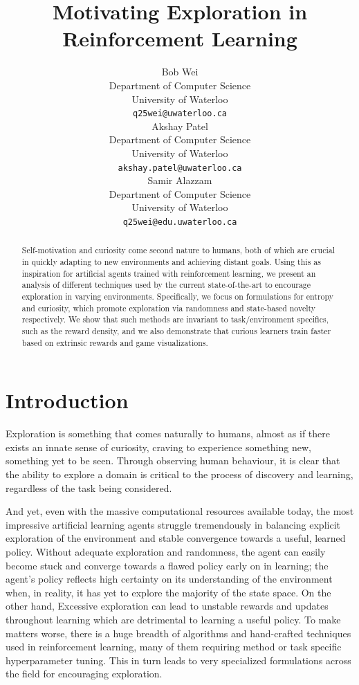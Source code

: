 \documentclass{article}
\title{Motivating Exploration in Reinforcement Learning}
\author{
  Bob Wei\\
  Department of Computer Science\\
  University of Waterloo\\
  \texttt{q25wei@uwaterloo.ca} \\
  \And
  Akshay Patel \\
  Department of Computer Science\\
  University of Waterloo\\
  \texttt{akshay.patel@uwaterloo.ca} \\
  \AND
  Samir Alazzam \\
  Department of Computer Science\\
  University of Waterloo\\
  \texttt{q25wei@edu.uwaterloo.ca} \\
}
\begin{document}
\maketitle

\begin{abstract}
Self-motivation and curiosity come second nature to humans, both of which are crucial in quickly adapting to new environments and achieving distant goals. Using this as inspiration for artificial agents trained with reinforcement learning, we present an analysis of different techniques used by the current state-of-the-art to encourage exploration in varying environments. Specifically, we focus on formulations for entropy and curiosity, which promote exploration via randomness and state-based novelty respectively. We show that such methods are invariant to task/environment specifics, such as the reward density, and we also demonstrate that curious learners train faster based on extrinsic rewards and game visualizations.
\end{abstract}

\section{Introduction}

Exploration is something that comes naturally to humans, almost as if there exists an innate sense of curiosity, craving to experience something new, something yet to be seen. Through observing human behaviour, it is clear that the ability to explore a domain is critical to the process of discovery and learning, regardless of the task being considered.

And yet, even with the massive computational resources available today, the most impressive artificial learning agents struggle tremendously in balancing explicit exploration of the environment and stable convergence towards a useful, learned policy. Without adequate exploration and randomness, the agent can easily become stuck and converge towards a flawed policy early on in learning; the agent's policy reflects high certainty on its understanding of the environment when, in reality, it has yet to explore the majority of the state space. On the other hand, Excessive exploration can lead to unstable rewards and updates throughout learning which are detrimental to learning a useful policy. To make matters worse, there is a huge breadth of algorithms and hand-crafted techniques used in reinforcement learning, many of them requiring method or task specific hyperparameter tuning. This in turn leads to very specialized formulations across the field for encouraging exploration.
\end{document}
